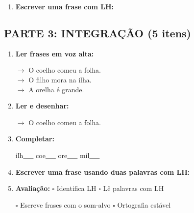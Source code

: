 \begin{exercicio}
\begin{enumerate}[resume]
  \item \textbf{Escrever uma frase com LH:}
  \begin{center}
  \underline{\hspace{12cm}}
  \end{center}

\end{enumerate}

\subsection*{PARTE 3: INTEGRAÇÃO (5 itens)}

\begin{enumerate}[resume]

  \item \textbf{Ler frases em voz alta:}
  \begin{center}
  $\rightarrow$ O coelho comeu a folha.\\
  $\rightarrow$ O filho mora na ilha.\\
  $\rightarrow$ A orelha é grande.\\
  \end{center}

  \item \textbf{Ler e desenhar:}
  \begin{center}
  $\rightarrow$ O coelho comeu a folha.
  \end{center}
  \begin{center}
  \end{center}

  \item \textbf{Completar:}
  \begin{center}
  ilh\underline{~~~} \quad coe\underline{~~~} \quad ore\underline{~~~} \quad mil\underline{~~~}
  \end{center}

  \item \textbf{Escrever uma frase usando duas palavras com LH:}
  \begin{center}
  \underline{\hspace{12cm}}
  \end{center}

  \item \textbf{Avaliação:} $\square$ Identifica LH \quad $\square$ Lê palavras com LH
  \begin{center}
  $\square$ Escreve frases com o som-alvo \quad $\square$ Ortografia estável
  \end{center}


\end{enumerate}
\end{exercicio}
